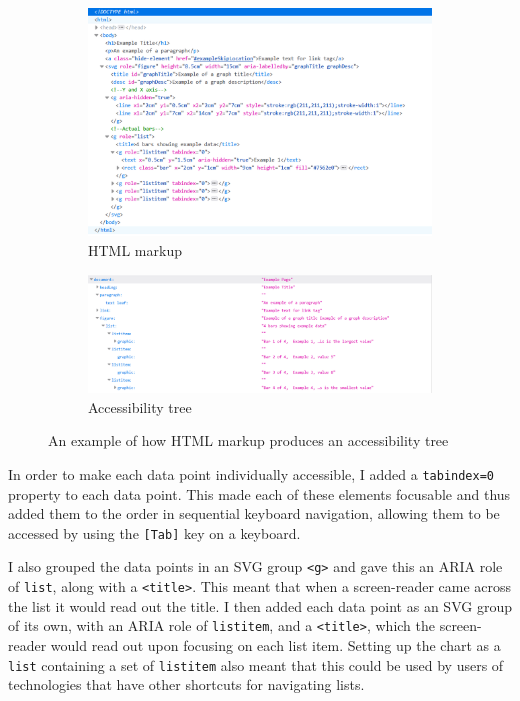 \documentclass[ %
                    author={Aleena Baig},
                supervisor={Dr Simon Lock},
                    degree={BSc},
                     title={On Making Web Accessible Graphs},
                  subtitle={},
                      year={2019} ]{dissertation}
\begin{document}
\begin{figure}[h]
  \centering
  \begin{subfigure}[b]{0.8\textwidth}
    \centering
    \includegraphics[width=\linewidth]{images/ExampleHTML.PNG}
     \caption{HTML markup}
  \end{subfigure}
  \begin{subfigure}[b]{0.8\textwidth}
    \centering
    \includegraphics[width=\linewidth]{images/ExampleAccessibilityTree.PNG}
    \caption{Accessibility tree}
  \end{subfigure}
  \caption{An example of how HTML markup produces an accessibility tree}
  \label{fig:HTMLATComparison}
\end{figure}

In order to make each data point individually accessible, I added a \texttt{tabindex=0} property to each data point. This made each of these elements focusable and thus added them to the order in sequential keyboard navigation, allowing them to be accessed by using the \texttt{[Tab]} key on a keyboard.

I also grouped the data points in an SVG group \texttt{<g>} and gave this an ARIA role of \texttt{list}, along with a \texttt{<title>}. This meant that when a screen-reader came across the list it would read out the title. I then added each data point as an SVG group of its own, with an ARIA role of \texttt{listitem}, and a \texttt{<title>}, which the screen-reader would read out upon focusing on each list item. Setting up the chart as a \texttt{list} containing a set of \texttt{listitem} also meant that this could be used by users of technologies that have other shortcuts for navigating lists.
\end{document}
